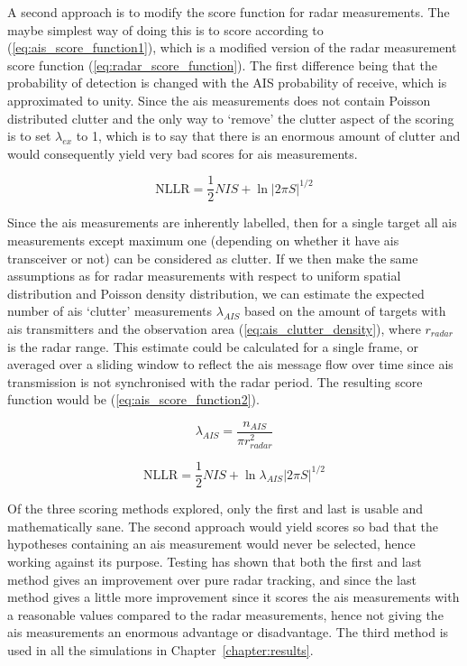 A second approach is to modify the score function for radar measurements. The maybe simplest way of doing this is to score according to (\ref{eq:ais_score_function1}), which is a modified version of the radar measurement score function (\ref{eq:radar_score_function}). The first difference being that the probability of detection is changed with the AIS probability of receive, which is approximated to unity. Since the \gls{ais} measurements does not contain Poisson distributed clutter and the only way to `remove' the clutter aspect of the scoring is to set \( \lambda_{ex} \) to 1, which is to say that there is an enormous amount of clutter and would consequently yield very bad scores for \gls{ais} measurements.

\begin{equation}\label{eq:ais_score_function1}
\mathrm{NLLR} = \frac{1}{2} NIS + \ln |2 \pi S|^{1/2} 
\end{equation}

Since the \gls{ais} measurements are inherently labelled, then for a single target all \gls{ais} measurements except maximum one (depending on whether it have \gls{ais} transceiver or not) can be  considered as clutter. If we then make the same assumptions as for radar measurements with respect to uniform spatial distribution and Poisson density distribution, we can estimate the expected number of \gls{ais} `clutter' measurements \( \lambda_{AIS} \) based on the amount of targets with \gls{ais} transmitters and the observation area (\ref{eq:ais_clutter_density}), where \(r_{radar}\) is the radar range. This estimate could be calculated for a single frame, or averaged over a sliding window to reflect the \gls{ais} message flow over time since \gls{ais} transmission is not synchronised with the radar period. The resulting score function would be (\ref{eq:ais_score_function2}).

\begin{equation}\label{eq:ais_clutter_density}
\lambda_{AIS} = \frac{n_{AIS}}{\pi r_{radar}^2}
\end{equation}

\begin{equation}\label{eq:ais_score_function2}
\mathrm{NLLR} = \frac{1}{2} NIS + \ln \lambda_{AIS} |2 \pi S|^{1/2} 
\end{equation}

Of the three scoring methods explored, only the first and last is usable and mathematically sane. The second approach would yield scores so bad that the hypotheses containing an \gls{ais} measurement would never be selected, hence working against its purpose. Testing has shown that both the first and last method gives an improvement over pure radar tracking, and since the last method gives a little more improvement since it scores the \gls{ais} measurements with a reasonable values compared to the radar measurements, hence not giving the \gls{ais} measurements an enormous advantage or disadvantage. The third method is used in all the simulations in Chapter~\ref{chapter:results}.

